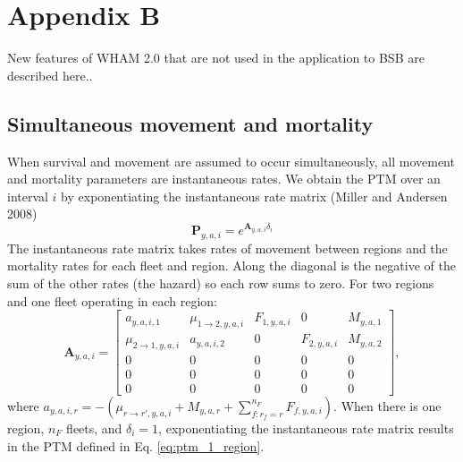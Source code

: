 \documentclass[
]{article}
\begin{document}
\setcounter{table}{0}
\renewcommand\thetable{A\arabic{table}}


\hypertarget{appendix-b}{%
\section*{Appendix B}\label{appendix-b}}

New features of WHAM 2.0 that are not used in the application to BSB are described here..

\hypertarget{simultaneous-movement-and-mortality}{%
\subsection*{Simultaneous movement and mortality}\label{simultaneous-movement-and-mortality}}

When survival and movement are assumed to occur simultaneously, all movement and mortality parameters are instantaneous rates. We obtain the PTM over an interval \(i\) by exponentiating the instantaneous rate matrix (Miller and Andersen 2008)
\begin{equation*}
\mathbf{P}_{y,a,i} = e^{\mathbf{A}_{y,a,i}\delta_i}
\end{equation*}
The instantaneous rate matrix takes rates of movement between regions and the mortality rates for each fleet and region. Along the diagonal is the negative of the sum of the other rates (the hazard) so each row sums to zero. For two regions and one fleet operating in each region:
\begin{equation*}
 \mathbf{A}_{y,a,i} = \begin{bmatrix}
 a_{y,a,i,1} & \mu_{1\rightarrow 2,y,a,i} & F_{1,y,a,i} & 0 & M_{y,a,1} \\
 \mu_{2\rightarrow 1,y,a,i} &  a_{y,a,i,2} & 0 & F_{2,y,a,i} & M_{y,a,2} \\
 0 & 0 & 0 & 0 & 0 \\
 0 & 0 & 0 & 0 & 0 \\
 0 & 0 & 0 & 0 & 0
 \end{bmatrix},
\end{equation*}
where \(a_{y,a,i,r} = -(\mu_{r\rightarrow r',y,a,i} + M_{y,a,r} + \sum^{n_F}_{f:r_f=r}F_{f,y,a,i})\). When there is one region, \(n_F\) fleets, and \(\delta_i = 1\), exponentiating the instantaneous rate matrix results in the PTM defined in Eq. \ref{eq:ptm_1_region}.
\end{document}

